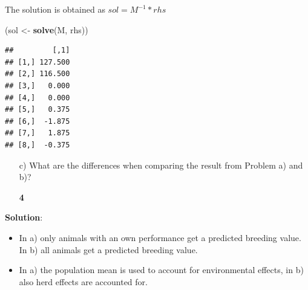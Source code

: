 \documentclass[]{article}
\newenvironment{Shaded}{\begin{snugshade}}{\end{snugshade}}
\newcommand{\KeywordTok}[1]{\textcolor[rgb]{0.13,0.29,0.53}{\textbf{#1}}}
\newcommand{\StringTok}[1]{\textcolor[rgb]{0.31,0.60,0.02}{#1}}
\newcommand{\NormalTok}[1]{#1}
\providecommand{\tightlist}{%
  \setlength{\itemsep}{0pt}\setlength{\parskip}{0pt}}
\newcommand{\points}[1]
{\begin{flushright}\textbf{#1}\end{flushright}}
\newcommand{\sol}
{\vspace{2ex}\textbf{Solution}:}
\begin{document}
The solution is obtained as \(sol = M^{-1} * rhs\)

\begin{Shaded}
\begin{Highlighting}[]
\NormalTok{(sol <-}\StringTok{ }\KeywordTok{solve}\NormalTok{(M, rhs))}
\end{Highlighting}
\end{Shaded}

\begin{verbatim}
##         [,1]
## [1,] 127.500
## [2,] 116.500
## [3,]   0.000
## [4,]   0.000
## [5,]   0.375
## [6,]  -1.875
## [7,]   1.875
## [8,]  -0.375
\end{verbatim}

\clearpage
\pagebreak

\begin{enumerate}
\item[c)] What are the differences when comparing the result from Problem a) and b)?
\points{4}
\end{enumerate}

\sol

\begin{itemize}
\tightlist
\item
  In a) only animals with an own performance get a predicted breeding
  value. In b) all animals get a predicted breeding value.
\item
  In a) the population mean is used to account for environmental
  effects, in b) also herd effects are accounted for.
\end{itemize}
\end{document}
